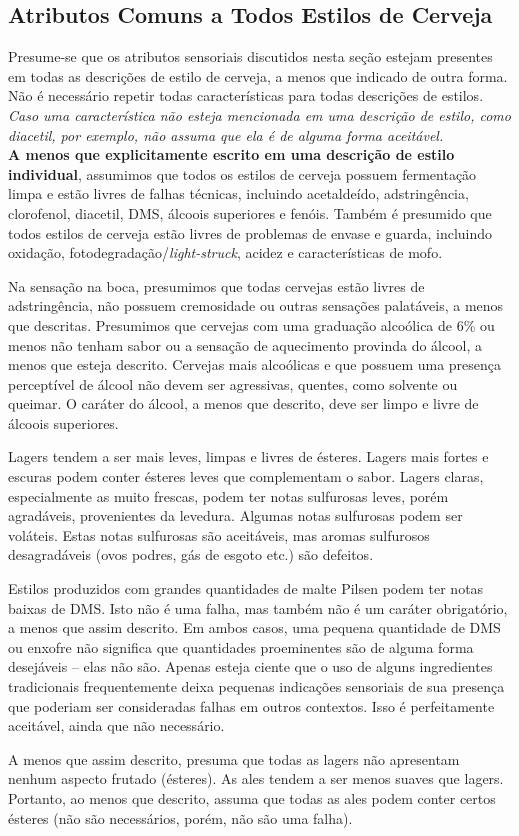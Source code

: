 \subsection*{Atributos Comuns a Todos Estilos de Cerveja}
Presume-se que os atributos sensoriais discutidos nesta seção estejam presentes em todas as descrições de estilo de cerveja, a menos que indicado de outra forma. Não é necessário repetir todas características para todas descrições de estilos. \textit{Caso uma característica não esteja mencionada em uma descrição de estilo, como diacetil, por exemplo, não assuma que ela é de alguma forma aceitável.}\\
\textbf{A menos que explicitamente escrito em uma descrição de estilo individual}, assumimos que todos os estilos de cerveja possuem fermentação limpa e estão livres de falhas técnicas, incluindo acetaldeído, adstringência, clorofenol, diacetil, DMS, álcoois superiores e fenóis. Também é presumido que todos estilos de cerveja estão livres de problemas de envase e guarda, incluindo oxidação, fotodegradação/\textit{light-struck}, acidez e características de mofo.

Na sensação na boca, presumimos que todas cervejas estão livres de adstringência, não possuem cremosidade ou outras sensações palatáveis, a menos que descritas. Presumimos que cervejas com uma graduação alcoólica de 6\% ou menos não tenham sabor ou a sensação de aquecimento provinda do álcool, a menos que esteja descrito. Cervejas mais alcoólicas e que possuem uma presença perceptível de álcool não devem ser agressivas, quentes, como solvente ou queimar. O caráter do álcool, a menos que descrito, deve ser limpo e livre de álcoois superiores.

Lagers tendem a ser mais leves, limpas e livres de ésteres. Lagers mais fortes e escuras podem conter ésteres leves que complementam o sabor. Lagers claras, especialmente as muito frescas, podem ter notas sulfurosas leves, porém agradáveis, provenientes da levedura. Algumas notas sulfurosas podem ser voláteis. Estas notas sulfurosas são aceitáveis, mas aromas sulfurosos desagradáveis (ovos podres, gás de esgoto etc.) são defeitos.

Estilos produzidos com grandes quantidades de malte Pilsen podem ter notas baixas de DMS. Isto não é uma falha, mas também não é um caráter obrigatório, a menos que assim descrito. Em ambos casos, uma pequena quantidade de DMS ou enxofre não significa que quantidades proeminentes são de alguma forma desejáveis – elas não são. Apenas esteja ciente que o uso de alguns ingredientes tradicionais frequentemente deixa pequenas indicações sensoriais de sua presença que poderiam ser consideradas falhas em outros contextos. Isso é perfeitamente aceitável, ainda que não necessário.

A menos que assim descrito, presuma que todas as lagers não apresentam nenhum aspecto frutado (ésteres). As ales tendem a ser menos suaves que lagers. Portanto, ao menos que descrito, assuma que todas as ales podem conter certos ésteres (não são necessários, porém, não são uma falha).
